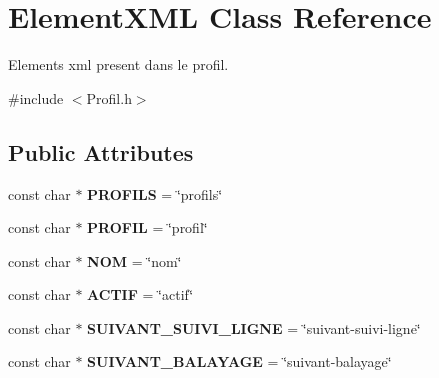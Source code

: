 \hypertarget{class_element_x_m_l}{}\section{Element\+X\+ML Class Reference}
\label{class_element_x_m_l}


Elements xml present dans le profil.  




{\ttfamily \#include $<$Profil.\+h$>$}

\subsection*{Public Attributes}
\begin{DoxyCompactItemize}
\item 
const char $\ast$ {\bfseries P\+R\+O\+F\+I\+LS} = \char`\"{}profils\char`\"{}\hypertarget{class_element_x_m_l_a359ee041e2fbae515d88e3bc37585d8f}{}\label{class_element_x_m_l_a359ee041e2fbae515d88e3bc37585d8f}

\item 
const char $\ast$ {\bfseries P\+R\+O\+F\+IL} = \char`\"{}profil\char`\"{}\hypertarget{class_element_x_m_l_a8c2a3b338f98b4eccbbf68395dcbb903}{}\label{class_element_x_m_l_a8c2a3b338f98b4eccbbf68395dcbb903}

\item 
const char $\ast$ {\bfseries N\+OM} = \char`\"{}nom\char`\"{}\hypertarget{class_element_x_m_l_a583dba04b3c35b3dd0884edf3b362d14}{}\label{class_element_x_m_l_a583dba04b3c35b3dd0884edf3b362d14}

\item 
const char $\ast$ {\bfseries A\+C\+T\+IF} = \char`\"{}actif\char`\"{}\hypertarget{class_element_x_m_l_a151913a03681553ac385e05da8b3bec0}{}\label{class_element_x_m_l_a151913a03681553ac385e05da8b3bec0}

\item 
const char $\ast$ {\bfseries S\+U\+I\+V\+A\+N\+T\+\_\+\+S\+U\+I\+V\+I\+\_\+\+L\+I\+G\+NE} = \char`\"{}suivant-\/suivi-\/ligne\char`\"{}\hypertarget{class_element_x_m_l_a65664992dcc9d4bce49717216cf2d4b8}{}\label{class_element_x_m_l_a65664992dcc9d4bce49717216cf2d4b8}

\item 
const char $\ast$ {\bfseries S\+U\+I\+V\+A\+N\+T\+\_\+\+B\+A\+L\+A\+Y\+A\+GE} = \char`\"{}suivant-\/balayage\char`\"{}\hypertarget{class_element_x_m_l_ac189ee615f443c552e2630c6ecd271e0}{}\label{class_element_x_m_l_ac189ee615f443c552e2630c6ecd271e0}


\end{DoxyCompactItemize}
